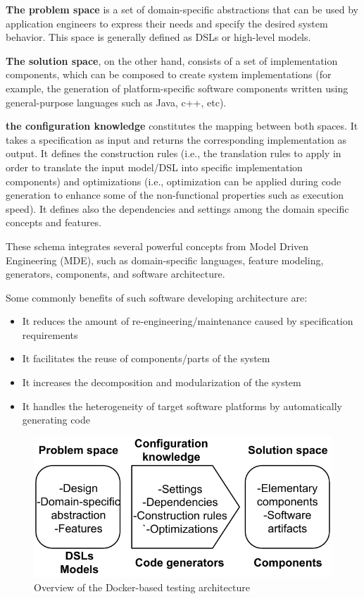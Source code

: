 \textbf{The problem space} is a set of domain-specific abstractions that can be used by application engineers to express their needs and specify the desired system behavior. This space is generally defined  as DSLs or high-level models. 

\textbf{The solution space}, on the other hand, consists of a set of implementation components, which can be composed to create system implementations (for example, the generation of platform-specific software components written using general-purpose languages such as Java, c++, etc).

\textbf{the configuration knowledge} constitutes the mapping between both spaces. It takes a specification as input and returns the corresponding implementation as output. It defines the construction rules (i.e., the translation rules to apply in order to translate the input model/DSL into specific implementation components) and optimizations (i.e., optimization can be applied during code generation to enhance some of the non-functional properties such as execution speed). It defines also the dependencies and settings among the domain specific concepts and features.


These schema integrates several powerful concepts from Model Driven Engineering (MDE), such as domain-specific languages, feature modeling, generators, components, and software architecture. 

Some commonly benefits of such software developing architecture are:
\begin{itemize}
\item It reduces the amount of re-engineering/maintenance caused by specification requirements
\item It facilitates the reuse of components/parts of the system
\item It increases the decomposition and modularization of the system
\item It handles the heterogeneity of target software platforms by automatically generating code
\end{itemize}
\begin{figure}[h]
	\center
	\includegraphics[scale=0.65]{Background/fig/GDM.pdf}
	\caption{Overview of the Docker-based testing architecture}
\end{figure}

